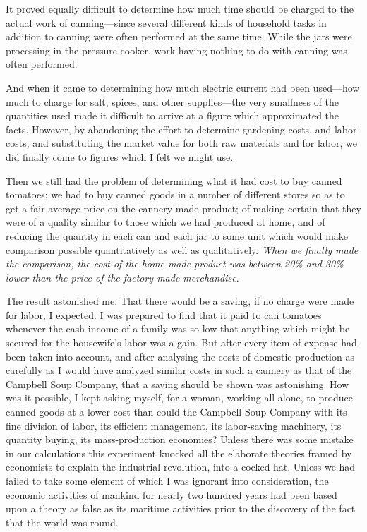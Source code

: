 \documentclass{book}
\begin{document}
It proved equally difficult to determine how much time should be charged to the actual work of canning—since several different kinds of household tasks in addition to canning were often performed at the same time. While the jars were processing in the pressure cooker, work having nothing to do with canning was often performed.

And when it came to determining how much electric current had been used—how much to charge for salt, spices, and other supplies—the very smallness of the quantities used made it difficult to arrive at a figure which approximated the facts. However, by abandoning the effort to determine gardening costs, and labor costs, and substituting the market value for both raw materials and for labor, we did finally come to figures which I felt we might use.

Then we still had the problem of determining what it had cost to buy canned tomatoes; we had to buy canned goods in a number of different stores so as to get a fair average price on the cannery-made product; of making certain that they were of a quality similar to those which we had produced at home, and of reducing the quantity in each can and each jar to some unit which would make comparison possible quantitatively as well as qualitatively. \emph{When we finally made the comparison, the cost of the home-made product was between 20\% and 30\% lower than the price of the factory-made merchandise}.

The result astonished me. That there would be a saving, if no charge were made for labor, I expected. I was prepared to find that it paid to can tomatoes whenever the cash income of a family was so low that anything which might be secured for the housewife’s labor was a gain. But after every item of expense had been taken into account, and after analysing the costs of domestic production as carefully as I would have analyzed similar costs in such a cannery as that of the Campbell Soup Company, that a saving should be shown was astonishing. How was it possible, I kept asking myself, for a woman, working all alone, to produce canned goods at a lower cost than could the Campbell Soup Company with its fine division of labor, its efficient management, its labor-saving machinery, its quantity buying, its mass-production economies? Unless there was some mistake in our calculations this experiment knocked all the elaborate theories framed by economists to explain the industrial revolution, into a cocked hat. Unless we had failed to take some element of which I was ignorant into consideration, the economic activities of mankind for nearly two hundred years had been based upon a theory as false as its maritime activities prior to the discovery of the fact that the world was round.
\end{document}
